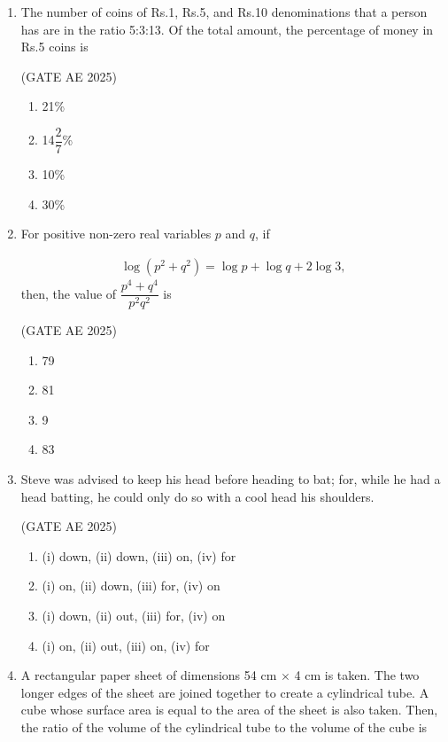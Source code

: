\documentclass[journal,12pt,onecolumn]{IEEEtran}
\theoremstyle{remark}
\begin{document}
\begin{flushleft}
\begin{enumerate}
\item The number of coins of Rs.1, Rs.5, and Rs.10 denominations that a person has are in the ratio 5:3:13.
Of the total amount, the percentage of money in Rs.5 coins is

\hfill(GATE AE 2025)

\begin{enumerate}
    \item 21\%
    \item 14$\dfrac{2}{7}$\%
    \item 10\% 
    \item 30\%
\end{enumerate}

\item For positive non-zero real variables $p$ and $q$, if 

\begin{align*}
    \log(p^2 + q^2) = \log p + \log q + 2 \log 3,
\end{align*}
then, the value of $\dfrac{p^4 + q^4}{p^2 q^2}$ is 

\hfill(GATE AE 2025)

\begin{enumerate}
    \item  79 
    \item 81 
    \item 9
    \item 83
\end{enumerate}

\item Steve was advised to keep his head \underline{\hspace{1.5cm}} before heading \underline{\hspace{1.5cm}} to bat; for, while he had a head \underline{\hspace{1.5cm}} batting, he could only do so with a cool head \underline{\hspace{1.5cm}} his shoulders. 

\hfill(GATE AE 2025)

\begin{enumerate}
    \item (i) down, (ii) down, (iii) on, (iv) for
    \item (i) on, (ii) down, (iii) for, (iv) on
    \item (i) down, (ii) out, (iii) for, (iv) on
    \item (i) on, (ii) out, (iii) on, (iv) for
\end{enumerate}

\item A rectangular paper sheet of dimensions 54 cm $\times$ 4 cm is taken. The two longer edges of the sheet are joined together to create a cylindrical tube. A cube whose surface area is equal to the area of the sheet is also taken. Then, the ratio of the volume of the cylindrical tube to the volume of the cube is 


\end{enumerate}
\end{flushleft}
\end{document}
